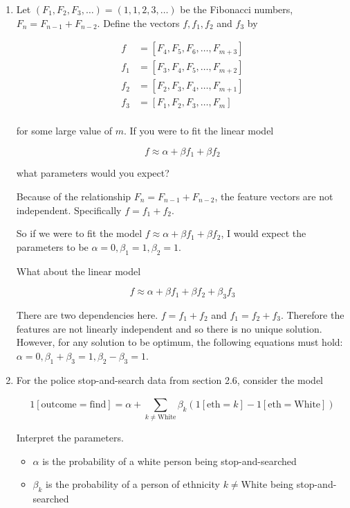 \documentclass[10pt,\jkfside,a4paper]{article}
\begin{document}
\begin{enumerate}[label=\arabic*]
\item Let $(F_1, F_2, F_3, \dots) = (1, 1, 2, 3, \dots)$ be the Fibonacci
numbers, $F_n = F_{n-1} + F_{n-2}$. Define the vectors $f, f_1, f_2$ and
$f_3$ by

\[
\begin{split}
f 	&= [F_4, F_5, F_6, \dots, F_{m+3}] \\
f_1 &= [F_3, F_4, F_5, \dots, F_{m+2}] \\
f_2 &= [F_2, F_3, F_4, \dots, F_{m+1}] \\
f_3 &= [F_1, F_2, F_3, \dots, F_{m}] \\
\end{split}
\]

for some large value of $m$. If you were to fit the linear model

\[
f \approx \alpha + \beta f_1 + \beta f_2
\]

what parameters would you expect?

Because of the relationship $F_n = F_{n-1} + F_{n-2}$, the feature vectors
are not independent. Specifically $f = f_1 + f_2$.

So if we were to fit the model $f \approx \alpha + \beta f_1 + \beta f_2$, I
would expect the parameters to be $\alpha=0, \beta_1=1, \beta_2=1$.

What about the linear model

\[
f \approx \alpha + \beta f_1 + \beta f_2 + \beta_3 f_3
\]

There are two dependencies here. $f = f_1 + f_2$ and $f_1 = f_2 + f_3$.
Therefore the features are not linearly independent and so there is no
unique solution. However, for any solution to be optimum, the following
equations must hold: $\alpha = 0, \beta_1 + \beta_3 = 1, \beta_2 - \beta_3
= 1$.

\item For the police stop-and-search data from section 2.6, consider the model

\[
1[\text{outcome}=\text{find}] = \alpha + \sum^{}_{k\neq\text{White}} \beta_k
(1[\text{eth}=k] - 1[\text{eth}=\text{White}])
\]

Interpret the parameters.

\begin{itemize}

\item $\alpha$ is the probability of a white person being stop-and-searched

\item $\beta_k$ is the probability of a person of ethnicity
$k\neq\text{White}$ being stop-and-searched


\end{itemize}
\end{enumerate}
\end{document}
